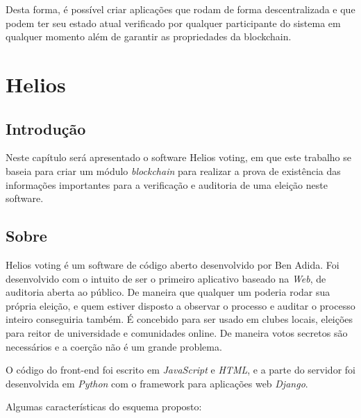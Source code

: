 \documentclass{ufsctex/ufsctex}
\begin{document}
Desta forma, é possível criar aplicações que rodam de forma descentralizada e
que podem ter seu estado atual verificado por qualquer participante do sistema
em qualquer momento além de garantir as propriedades da blockchain.

\chapter{Helios}

\section{Introdução}

Neste capítulo será apresentado o software Helios voting, em que este trabalho
se baseia para criar um módulo \textit{blockchain} para realizar a prova de
existência das informações importantes para a verificação e auditoria de uma
eleição neste software.

\section{Sobre}

Helios voting é um software de código aberto desenvolvido por Ben Adida. Foi
desenvolvido com o intuito de ser o primeiro aplicativo baseado na
\textit{Web}, de auditoria aberta ao público. De maneira que qualquer um
poderia rodar sua própria eleição, e quem estiver disposto a observar o
processo e auditar o processo inteiro conseguiria também. É concebido para ser
usado em clubes locais, eleições para reitor de universidade e comunidades
online. De maneira votos secretos são necessários e a coerção não é um grande
problema.\cite{benAdida}

O código do front-end foi escrito em \textit{JavaScript} e \textit{HTML}, e a
parte do servidor foi desenvolvida em \textit{Python} com o framework para
aplicações web \textit{Django}. 

Algumas características do esquema proposto:
\end{document}
